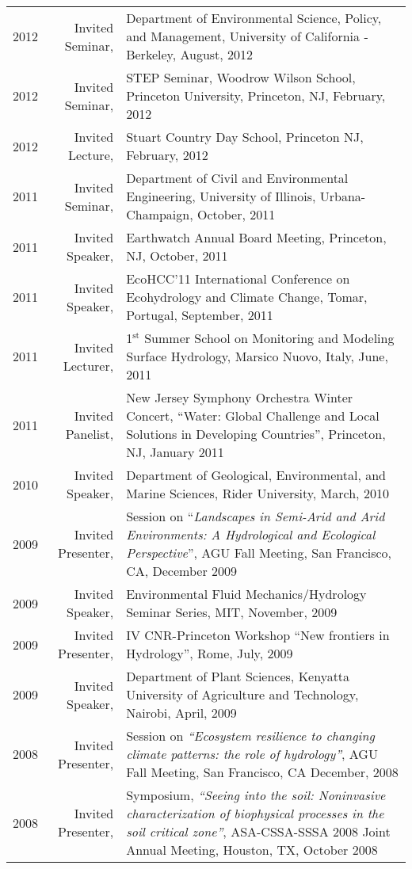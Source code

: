 \documentclass[10pt]{report}
\begin{document}
\begin{longtable}{p{.25in} r p{}}
2012 & Invited Seminar, & Department of Environmental Science, Policy, and Management, University of California - Berkeley, August, 2012 \\ 
2012 & Invited Seminar, & STEP Seminar, Woodrow Wilson School, Princeton University, Princeton, NJ, February, 2012 \\
2012 & Invited Lecture, & Stuart Country Day School, Princeton NJ, February, 2012 \\
2011 & Invited Seminar, & Department of Civil and Environmental Engineering, University of Illinois, Urbana-Champaign, October, 2011 \\ 
2011 & Invited Speaker, & Earthwatch Annual Board Meeting, Princeton, NJ, October, 2011 \\
2011 & Invited  Speaker, & EcoHCC'11 International Conference on Ecohydrology and Climate Change, Tomar, Portugal, September, 2011 \\ 
2011 & Invited Lecturer, & 1$^{\mbox{st}}$ Summer School on Monitoring and Modeling Surface Hydrology, Marsico Nuovo, Italy, June, 2011 \\
2011 & Invited Panelist, & New Jersey Symphony Orchestra Winter Concert, ``Water: Global Challenge and Local Solutions in Developing Countries'', Princeton, NJ, January 2011 \\
2010 & Invited Speaker, & Department of Geological, Environmental, and Marine Sciences, Rider University, March, 2010 \\
2009 & Invited Presenter, & Session on ``\emph{Landscapes in Semi-Arid and Arid Environments: A Hydrological and Ecological Perspective}'', AGU Fall Meeting, San Francisco, CA, December 2009 \\ 
2009 & Invited Speaker, & Environmental Fluid Mechanics/Hydrology Seminar Series, MIT, November, 2009 \\
2009 & Invited Presenter, & IV CNR-Princeton Workshop ``New frontiers in Hydrology'', Rome, July, 2009 \\
2009 & Invited Speaker, & Department of Plant Sciences, Kenyatta University of Agriculture and Technology, Nairobi, April, 2009 \\
2008 & Invited Presenter, & Session on \emph{``Ecosystem resilience to changing climate patterns: the role of hydrology''}, AGU Fall Meeting, San Francisco, CA December, 2008 \\
2008 & Invited Presenter, & Symposium, \emph{``Seeing into the soil: Noninvasive characterization of biophysical processes in the soil critical zone''}, ASA-CSSA-SSSA 2008 Joint Annual Meeting, Houston, TX, October 2008 \\

\end{longtable}
\end{document}
